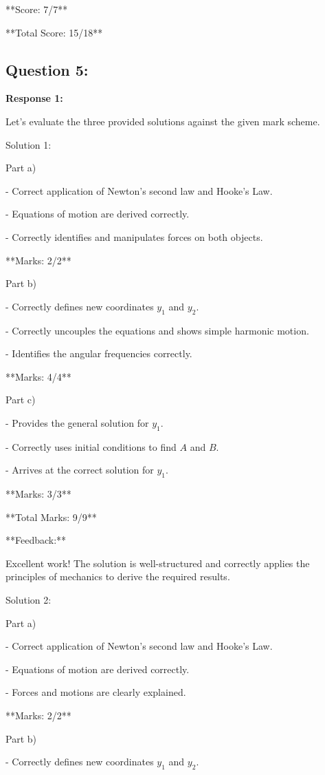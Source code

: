\documentclass[a4paper,11pt]{article}
\begin{document}
**Score: 7/7**

**Total Score: 15/18**

\subsection*{Question 5:}

\textbf{Response 1:}

Let's evaluate the three provided solutions against the given mark scheme.

Solution 1:

Part a)

- Correct application of Newton's second law and Hooke's Law.

- Equations of motion are derived correctly.

- Correctly identifies and manipulates forces on both objects.

**Marks: 2/2**

Part b)

- Correctly defines new coordinates \( y_1 \) and \( y_2 \).

- Correctly uncouples the equations and shows simple harmonic motion.

- Identifies the angular frequencies correctly.

**Marks: 4/4**

Part c)

- Provides the general solution for \( y_1 \).

- Correctly uses initial conditions to find \( A \) and \( B \).

- Arrives at the correct solution for \( y_1 \).

**Marks: 3/3**

**Total Marks: 9/9**

**Feedback:**

Excellent work! The solution is well-structured and correctly applies the principles of mechanics to derive the required results.

Solution 2:

Part a)

- Correct application of Newton's second law and Hooke's Law.

- Equations of motion are derived correctly.

- Forces and motions are clearly explained.

**Marks: 2/2**

Part b)

- Correctly defines new coordinates \( y_1 \) and \( y_2 \).
\end{document}
